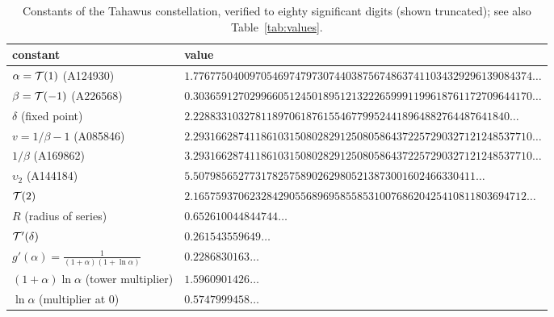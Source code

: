 \begin{table}[t]
\centering
\footnotesize
\caption{Constants of the Tahawus constellation, verified to eighty
significant digits (shown truncated); see also
Table~\ref{tab:values}.}
\label{tab:constants}
\begin{tabular}{@{}ll@{}}
\toprule
constant & value \\
\midrule
$\alpha = \mathcal{T}(1)$ (A124930) & $1.776775040097054697479730744038756748637411034329296139084374\ldots$ \\
$\beta = \mathcal{T}(-1)$ (A226568) & $0.303659127029966051245018951213222659991199618761172709644170\ldots$ \\
$\delta$ (fixed point) & $2.22883310327811897061876155467799524418964882764487641840\ldots$ \\
$v = 1/\beta - 1$ (A085846) & $2.293166287411861031508028291250805864372257290327121248537710\ldots$ \\
$1/\beta$ (A169862) & $3.293166287411861031508028291250805864372257290327121248537710\ldots$ \\
$\upsilon_{2}$ (A144184) & $5.50798565277317825758902629805213873001602466330411\ldots$ \\
$\mathcal{T}(2)$ & $2.16575937062328429055689695855853100768620425410811803694712\ldots$ \\
$R$ (radius of series) & $0.652610044844744\ldots$ \\
$\mathcal{T}'(\delta)$ & $0.261543559649\ldots$ \\
$g'(\alpha) = \tfrac{1}{(1+\alpha)(1+\ln\alpha)}$ & $0.2286830163\ldots$ \\
$(1+\alpha)\ln\alpha$ (tower multiplier) & $1.5960901426\ldots$ \\
$\ln\alpha$ (multiplier at $0$) & $0.5747999458\ldots$ \\
\bottomrule
\end{tabular}
\end{table}
